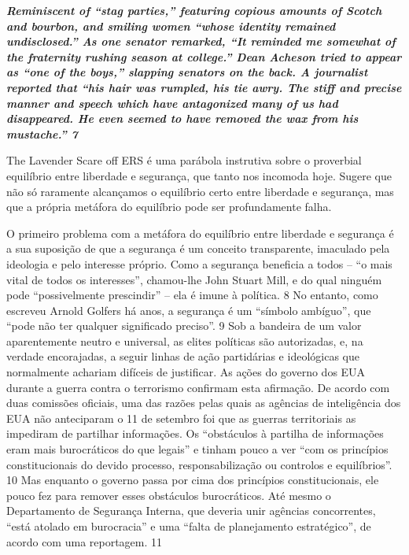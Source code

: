  \textbf{\textit{Reminiscent of “stag parties,” featuring copious amounts of Scotch and bourbon, and smiling women “whose identity remained undisclosed.” As one senator remarked, “It reminded me somewhat of the fraternity rushing season at college.” Dean Acheson tried to appear as “one of the boys,” slapping senators on the back. A journalist reported that “his hair was rumpled, his tie awry. The stiff and precise manner and speech which have antagonized many of us had disappeared. He even seemed to have removed the wax from his mustache.” {{\color{blue} 7} } } }  
 
 
\par
 
The Lavender Scare off ERS é uma parábola instrutiva sobre o proverbial equilíbrio entre liberdade e segurança, que tanto nos incomoda hoje. Sugere que não só raramente alcançamos o equilíbrio certo entre liberdade e segurança, mas que a própria metáfora do equilíbrio pode ser profundamente falha.
 
\par
 
O primeiro problema com a metáfora do equilíbrio entre liberdade e segurança é a sua suposição de que a segurança é um conceito transparente, imaculado pela ideologia e pelo interesse próprio. Como a segurança beneficia a todos – “o mais vital de todos os interesses”, chamou-lhe John Stuart Mill, e do qual ninguém pode “possivelmente prescindir” – ela é imune à política.
 {\color{blue} 8}  
No entanto, como escreveu Arnold Golfers há anos, a segurança é um “símbolo ambíguo”, que “pode não ter qualquer significado preciso”.
 {\color{blue} 9}  
Sob a bandeira de um valor aparentemente neutro e universal, as elites políticas são autorizadas, e, na verdade encorajadas, a seguir linhas de ação partidárias e ideológicas que normalmente achariam difíceis de justificar. As ações do governo dos EUA durante a guerra contra o terrorismo confirmam esta afirmação. De acordo com duas comissões oficiais, uma das razões pelas quais as agências de inteligência dos EUA não anteciparam o 11 de setembro foi que as guerras territoriais as impediram de partilhar informações. Os “obstáculos à partilha de informações eram mais burocráticos do que legais” e tinham pouco a ver “com os princípios constitucionais do devido processo, responsabilização ou controlos e equilíbrios”.
 {\color{blue} 10}  
Mas enquanto o governo passa por cima dos princípios constitucionais, ele pouco fez para remover esses obstáculos burocráticos. Até mesmo o Departamento de Segurança Interna, que deveria unir agências concorrentes, “está atolado em burocracia” e uma “falta de planejamento estratégico”, de acordo com uma reportagem.
 {\color{blue} 11}  

